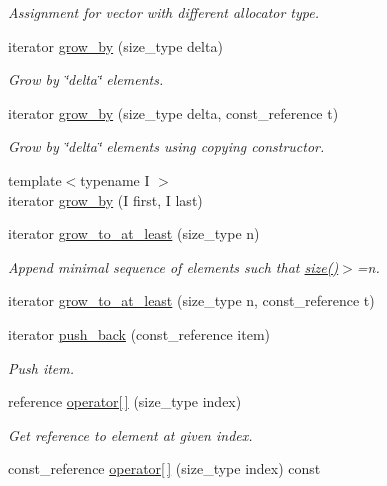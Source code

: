 \begin{DoxyCompactItemize}
\begin{DoxyCompactList}\small\item\em Assignment for vector with different allocator type. \end{DoxyCompactList}\item 
iterator \hyperlink{classtbb_1_1concurrent__vector_af0b44ba95fafde1b92148a2ef4a5568d}{grow\+\_\+by} (size\+\_\+type delta)
\begin{DoxyCompactList}\small\item\em Grow by \char`\"{}delta\char`\"{} elements. \end{DoxyCompactList}\item 
iterator \hyperlink{classtbb_1_1concurrent__vector_abba25587a5705b02568d0212071f0799}{grow\+\_\+by} (size\+\_\+type delta, const\+\_\+reference t)
\begin{DoxyCompactList}\small\item\em Grow by \char`\"{}delta\char`\"{} elements using copying constructor. \end{DoxyCompactList}\item 
{\footnotesize template$<$typename I $>$ }\\iterator \hyperlink{classtbb_1_1concurrent__vector_a229978f56ee9bcb8fe721587385d62a9}{grow\+\_\+by} (I first, I last)
\item 
iterator \hyperlink{classtbb_1_1concurrent__vector_a0318df2adb8e0a9c0af964ca7659e1d6}{grow\+\_\+to\+\_\+at\+\_\+least} (size\+\_\+type n)
\begin{DoxyCompactList}\small\item\em Append minimal sequence of elements such that \hyperlink{classtbb_1_1concurrent__vector_a6cac13e24ff09a230f543ff5f523ee7c}{size()}$>$=n. \end{DoxyCompactList}\item 
iterator \hyperlink{classtbb_1_1concurrent__vector_a69b4780920c11bd372c77cb8f240b009}{grow\+\_\+to\+\_\+at\+\_\+least} (size\+\_\+type n, const\+\_\+reference t)
\item 
iterator \hyperlink{classtbb_1_1concurrent__vector_a74722c89e45bd3291eea34575daf4f39}{push\+\_\+back} (const\+\_\+reference item)
\begin{DoxyCompactList}\small\item\em Push item. \end{DoxyCompactList}\item 
reference \hyperlink{classtbb_1_1concurrent__vector_ac70975c8f71b9f8acbda50188c5b4f5d}{operator\mbox{[}$\,$\mbox{]}} (size\+\_\+type index)
\begin{DoxyCompactList}\small\item\em Get reference to element at given index. \end{DoxyCompactList}\item 
\hypertarget{classtbb_1_1concurrent__vector_ab233686fd3c55cdca599dbb35171fabe}{}const\+\_\+reference \hyperlink{classtbb_1_1concurrent__vector_ab233686fd3c55cdca599dbb35171fabe}{operator\mbox{[}$\,$\mbox{]}} (size\+\_\+type index) const \label{classtbb_1_1concurrent__vector_ab233686fd3c55cdca599dbb35171fabe}


\end{DoxyCompactItemize}
